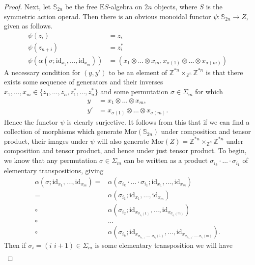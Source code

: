 \documentclass{amsbook} %
\newcommand{\id}{\textrm{id}}
\newcommand{\trans}[2]{( #1 \, \, #2 )}
\numberwithin{section}{chapter}
\begin{document}
\begin{proof}
Next, let $\mathbb{S}_{2n}$ be the free $\mathrm{E}S$-algebra on $2n$ objects, where $S$ is the symmetric action operad. Then there is an obvious monoidal functor $\psi \colon \mathbb{S}_{2n} \rightarrow Z$, given as follows.
  \begin{align*}
		 \psi(z_i) &= z_i \\
		 \psi(z_{n+i}) &= z_i^* \\
		 \psi(\alpha(\sigma; \id_{x_1}, \ldots, \id_{x_m})) &= (x_1 \otimes \ldots \otimes x_m, x_{\sigma(1)} \otimes \ldots \otimes x_{\sigma(m)})
	\end{align*}
A necessary condition for $(y, y')$ to be an element of $\mathbb{Z}^{\ast n} \times_{\mathbb{Z}^n} \mathbb{Z}^{\ast n}$ is that there exists some sequence of generators and their inverses $x_1, \ldots, x_m \in \{z_1, \ldots, z_n, z_1^*, \ldots, z_n^*\}$ and some permutation $\sigma \in \Sigma_m$ for which
  \begin{align*}
    y &= x_1 \otimes \ldots \otimes x_m,\\
    y' &= x_{\sigma(1)} \otimes \ldots \otimes x_{\sigma(m)}.
  \end{align*}
Hence the functor $\psi$ is clearly surjective. It follows from this that if we can find a collection of morphisms which generate $\mathrm{Mor}(\mathbb{S}_{2n})$ under composition and tensor product, their images under $\psi$ will also generate $\mathrm{Mor}(Z) = \mathbb{Z}^{\ast n} \times_{\mathbb{Z}^n} \mathbb{Z}^{\ast n}$ under composition and tensor product, and hence under just tensor product. To begin, we know that any permutation $\sigma \in \Sigma_m$ can be written as a product $\sigma_{i_k} \cdot \ldots \cdot \sigma_{i_1}$ of elementary transpositions, giving
  \begin{align*}
  	\alpha(\sigma;\id_{x_1}, \ldots, \id_{x_m}) = &\alpha(\sigma_{i_k} \cdot \ldots \cdot \sigma_{i_1}; \id_{x_1}, \ldots, \id_{x_m}) \\
  	= &\alpha(\sigma_{i_1}; \id_{x_1}, \ldots, \id_{x_m})  \\
  	\circ &\alpha(\sigma_{i_2}; \id_{x_{\sigma_{i_1}(1)}}, \ldots, \id_{x_{\sigma_{i_1}(m)}}) \\
    \circ &\ldots \\
  	\circ &\alpha(\sigma_{i_k}; \id_{x_{\sigma_{i_{k-1}} \cdot \ldots \cdot \sigma_{i_1}(1)}}, \ldots, \id_{x_{\sigma_{i_{k-1}} \cdot \ldots \cdot \sigma_{i_1}(m)}}).
  \end{align*}
Then if $\sigma_i = \trans{i}{i+1} \in \Sigma_m$ is some elementary transposition we will have
  \begin{align*}

\end{align*}
\end{proof}
\end{document}
